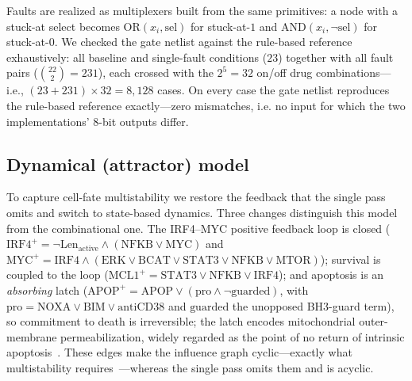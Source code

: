 \documentclass[conference,letterpaper]{IEEEtran}
\begin{document}
Faults are realized as multiplexers built from the same primitives: a node with a
stuck-at select becomes $\mathrm{OR}(x_i,\mathrm{sel})$ for stuck-at-$1$ and
$\mathrm{AND}(x_i,\lnot\mathrm{sel})$ for stuck-at-$0$. We checked the gate
netlist against the rule-based reference exhaustively: all baseline and
single-fault conditions ($23$) together with all fault pairs
($\binom{22}{2}=231$), each crossed with the $2^{5}=32$ on/off drug
combinations---i.e., $(23+231)\times 32 = 8{,}128$ cases. On every case the
gate netlist reproduces the rule-based reference exactly---zero mismatches, i.e.
no input for which the two implementations' $8$-bit outputs differ.

\subsection{Dynamical (attractor) model}\label{sec:attr}
To capture cell-fate multistability we restore the feedback that the single pass
omits and switch to state-based dynamics. Three changes distinguish this model
from the combinational one. The IRF4--MYC positive feedback loop is closed
($\text{IRF4}^{+}=\lnot\text{Len}_{\text{active}}\wedge(\text{NFKB}\vee\text{MYC})$
and $\text{MYC}^{+}=\text{IRF4}\wedge(\text{ERK}\vee\text{BCAT}\vee\text{STAT3}
\vee\text{NFKB}\vee\text{MTOR})$); survival is coupled to the loop
($\text{MCL1}^{+}=\text{STAT3}\vee\text{NFKB}\vee\text{IRF4}$); and apoptosis is
an \emph{absorbing} latch
($\text{APOP}^{+}=\text{APOP}\vee(\text{pro}\wedge\lnot\text{guarded})$, with
$\text{pro}=\text{NOXA}\vee\text{BIM}\vee\text{antiCD38}$ and $\text{guarded}$ the
unopposed BH3-guard term), so commitment to death is irreversible; the latch encodes mitochondrial
outer-membrane permeabilization, widely regarded as the point of no return of
intrinsic apoptosis~\cite{tait}. These edges
make the influence graph cyclic---exactly what multistability
requires~\cite{thomas}---whereas the single pass omits them and is acyclic.
\end{document}
